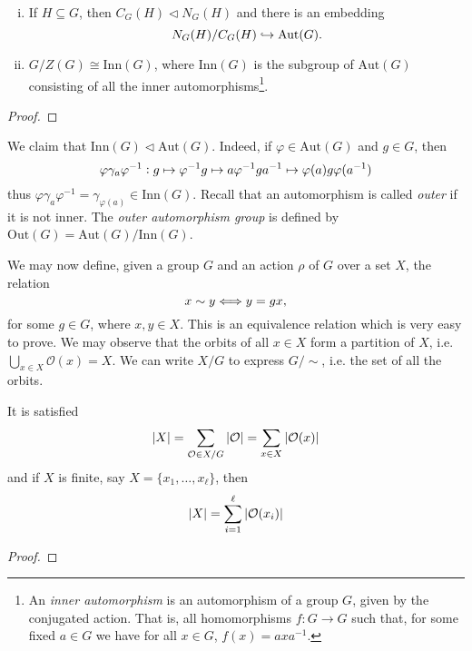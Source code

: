 \documentclass[../main.tex]{subfiles}
\begin{document}
\begin{prop}
\begin{enumerate}[(i)]
    \item If $H\subseteq G$, then $C_G(H)\vartriangleleft N_G(H)$ and there is an embedding
    \begin{equation}
        \notag
        N_G(H)/C_G(H)\hookrightarrow \mathrm{Aut}(G).   
    \end{equation}
    \item $G/Z(G)\cong \mathrm{Inn}(G)$, where $\mathrm{Inn}(G)$ is the subgroup of $\mathrm{Aut}(G)$ consisting of all the inner automorphisms\footnote{An \textit{inner automorphism} is an automorphism of a group $G$, given by the conjugated action. That is, all homomorphisms $f:G\rightarrow G$ such that, for some fixed $a\in G$ we have for all $x\in G$, $f(x) = axa^{-1}$.}.
\end{enumerate}
\end{prop}
\begin{proof}
\noproof
\end{proof}

\begin{nota}
 We claim that $\mathrm{Inn}(G)\vartriangleleft\mathrm{Aut}(G)$. Indeed, if $\varphi\in\mathrm{Aut}(G)$ and $g\in G$, then 
\begin{equation}
    \notag
    \varphi\gamma_a\varphi^{-1}:g\mapsto\varphi^{-1}g\mapsto a\varphi^{-1}ga^{-1}\mapsto\varphi(a)g\varphi(a^{-1})
\end{equation}
thus $\varphi\gamma_a\varphi^{-1} = \gamma_{\varphi(a)}\in\mathrm{Inn}(G)$. Recall that an automorphism is called \textit{outer} if it is not inner. The \textit{outer automorphism group} is defined by $\mathrm{Out}(G) = \mathrm{Aut}(G)/\mathrm{Inn}(G)$.
\end{nota}

We may now define, given a group $G$ and an action $\rho$ of $G$ over a set $X$, the relation
\begin{equation}
    \notag
    x\sim y\Longleftrightarrow y = gx,
\end{equation}
for some $g\in G$, where $x,y\in X$. This is an equivalence relation which is very easy to prove. We may observe that the orbits of all $x\in X$ form a partition of $X$, i.e. $\bigcup_{x\in X}\mathcal{O}(x) = X$. We can write $X/G$ to express $G/\sim$, i.e. the set of all the orbits. 

\begin{prop}
It is satisfied
\begin{equation}
    \notag
    |X| = \sum_{\mathcal{O}\in X/G}|\mathcal{O}| = \sum_{x\in X}|\mathcal{O}(x)|
\end{equation}
and if $X$ is finite, say $X = \{x_1,\ldots,x_\ell\}$, then
\begin{equation}
    \notag
    |X| = \sum_{i=1}^\ell |\mathcal{O}(x_i)|
\end{equation}
\end{prop}
\begin{proof}
\noproof
\end{proof}
\end{document}
